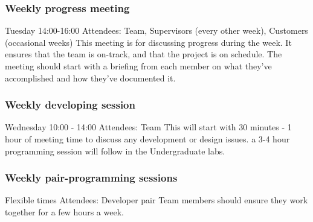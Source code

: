 \subsubsection{Weekly progress meeting}
Tuesday 14:00-16:00
Attendees: Team, Supervisors (every other week), Customers (occasional weeks)
This meeting is for discussing progress during the week. It ensures that the team is on-track, and that the project is on schedule. The meeting should start with a briefing from each member on what they've accomplished and how they've documented it.

\subsubsection{Weekly developing session}
Wednesday 10:00 - 14:00
Attendees: Team
This will start with 30 minutes - 1 hour of meeting time to discuss any development or design issues. a 3-4 hour programming session will follow in the Undergraduate labs.

\subsubsection{Weekly pair-programming sessions}
Flexible times
Attendees: Developer pair
Team members should ensure they work together for a few hours a week. 

